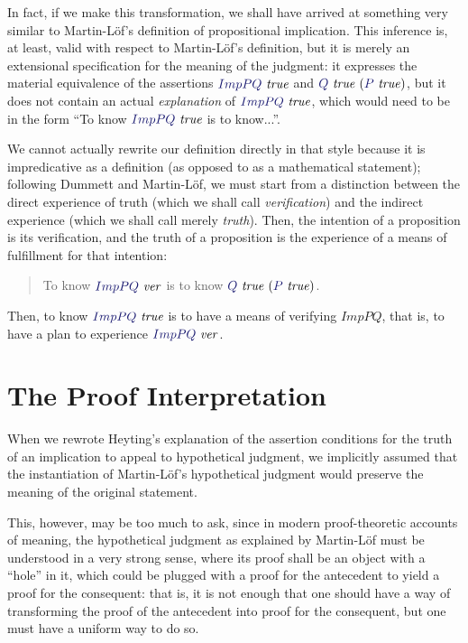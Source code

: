 \documentclass[11pt]{amsart}
\theoremstyle{definition}
\theoremstyle{remark}
\numberwithin{equation}{section}
\def\InputModeColorName{MidnightBlue}
\newcommand\InputMode[1]{{\color{\InputModeColorName}{#1}}}
\newcommand\HypJ[2]{#1\ (#2)}
\newcommand\IsVer[1]{\InputMode{#1}\ \mathit{ver}}
\newcommand\IsTrue[1]{\InputMode{#1}\ \mathit{true}}
\begin{document}
In fact, if we make this transformation, we shall have arrived at something very
similar to Martin-L\"of's definition of propositional implication. This
inference is, at least, valid with respect to Martin-L\"of's definition, but it
is merely an extensional specification for the meaning of the judgment: it
expresses the material equivalence of the assertions $\IsTrue{Imp{P}{Q}}$ and
$\HypJ{\IsTrue{Q}}{\IsTrue{P}}$, but it does not contain an actual
\emph{explanation} of $\IsTrue{Imp{P}{Q}}$, which would need to be in the form ``To
know $\IsTrue{Imp{P}{Q}}$ is to know...''.

We cannot actually rewrite our definition directly in that style because it is
impredicative as a definition (as opposed to as a mathematical statement);
following Dummett \cite{Dummett:Elements} and Martin-L\"of, we must start from a
distinction between the direct experience of truth (which we shall call
\emph{verification}) and the indirect experience (which we shall call merely
\emph{truth}). Then, the intention of a proposition is its verification, and the
truth of a proposition is the experience of a means of fulfillment for that
intention:

\begin{quote}
  To know $\IsVer{Imp{P}{Q}}$ is to know $\HypJ{\IsTrue{Q}}{\IsTrue{P}}$.
\end{quote}

Then, to know $\IsTrue{Imp{P}{Q}}$ is to have a means of verifying $Imp{P}{Q}$, that
is, to have a plan to experience $\IsVer{Imp{P}{Q}}$.

\section{The Proof Interpretation}

When we rewrote Heyting's explanation of the assertion conditions for the truth
of an implication to appeal to hypothetical judgment, we implicitly assumed that
the instantiation of Martin-L\"of's hypothetical judgment would preserve the
meaning of the original statement.

This, however, may be too much to ask, since in modern proof-theoretic accounts
of meaning, the hypothetical judgment as explained by Martin-L\"of must be
understood in a very strong sense, where its proof shall be an object with a
``hole'' in it, which could be plugged with a proof for the antecedent to yield
a proof for the consequent: that is, it is not enough that one should have a way
of transforming the proof of the antecedent into proof for the consequent, but
one must have a uniform way to do so.
\end{document}
